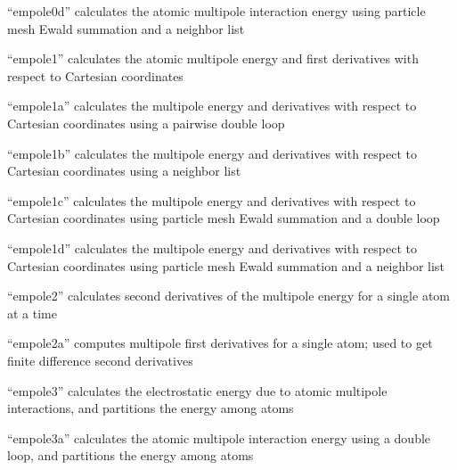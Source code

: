 \documentclass[letterpaper,11pt,english]{sphinxmanual}
\begin{document}
\sphinxAtStartPar
“empole0d” calculates the atomic multipole interaction energy using particle mesh Ewald summation and a neighbor list

\sphinxAtStartPar
{}

\sphinxAtStartPar
“empole1” calculates the atomic multipole energy and first derivatives with respect to Cartesian coordinates

\sphinxAtStartPar
{}

\sphinxAtStartPar
“empole1a” calculates the multipole energy and derivatives with respect to Cartesian coordinates using a pairwise double loop

\sphinxAtStartPar
{}

\sphinxAtStartPar
“empole1b” calculates the multipole energy and derivatives with respect to Cartesian coordinates using a neighbor list

\sphinxAtStartPar
{}

\sphinxAtStartPar
“empole1c” calculates the multipole energy and derivatives with respect to Cartesian coordinates using particle mesh Ewald summation and a double loop

\sphinxAtStartPar
{}

\sphinxAtStartPar
“empole1d” calculates the multipole energy and derivatives with respect to Cartesian coordinates using particle mesh Ewald summation and a neighbor list

\sphinxAtStartPar
{}

\sphinxAtStartPar
“empole2” calculates second derivatives of the multipole energy for a single atom at a time

\sphinxAtStartPar
{}

\sphinxAtStartPar
“empole2a” computes multipole first derivatives for a single atom; used to get finite difference second derivatives

\sphinxAtStartPar
{}

\sphinxAtStartPar
“empole3” calculates the electrostatic energy due to atomic multipole interactions, and partitions the energy among atoms

\sphinxAtStartPar
{}

\sphinxAtStartPar
“empole3a” calculates the atomic multipole interaction energy using a double loop, and partitions the energy among atoms
\end{document}
